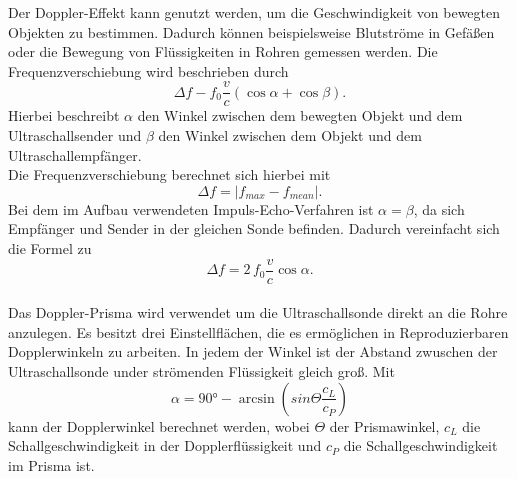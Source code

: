 Der Doppler-Effekt kann genutzt werden, um die Geschwindigkeit von bewegten Objekten zu bestimmen.
Dadurch können beispielsweise Blutströme in Gefäßen oder die Bewegung von Flüssigkeiten in Rohren gemessen werden.
Die Frequenzverschiebung wird beschrieben durch
\begin{equation*}
    Δf - f_0 \frac{v}{c} \left(\cos{α} + \cos{β}\right).
\end{equation*}%
Hierbei beschreibt $α$ den Winkel zwischen dem bewegten Objekt und dem Ultraschallsender und $β$ den Winkel zwischen dem Objekt 
und dem Ultraschallempfänger.\\
Die Frequenzverschiebung berechnet sich hierbei mit 
\begin{equation}\label{eq:fver}
    \Delta f = |f_{max} - f_{mean}|.
\end{equation}
Bei dem im Aufbau verwendeten Impuls-Echo-Verfahren ist $α = β$, da sich Empfänger und Sender in der gleichen Sonde befinden. Dadurch vereinfacht sich die Formel zu 
\begin{equation}\label{eq:Frequenzverschiebung}
    Δf = 2\, f_0 \frac{v}{c} \cos{α}.
\end{equation}
\\
Das Doppler-Prisma wird verwendet um die Ultraschallsonde direkt an die Rohre anzulegen.
Es besitzt drei Einstellflächen, die es ermöglichen in Reproduzierbaren Dopplerwinkeln zu arbeiten.
In jedem der Winkel ist der Abstand zwuschen der Ultraschallsonde under strömenden Flüssigkeit gleich groß.
Mit 
\begin{equation}\label{eq:Dopplerwinkel}
    α = 90° - \arcsin{\left(sin{Θ}\frac{c_L}{c_P}\right)}
\end{equation}
kann der Dopplerwinkel berechnet werden, wobei $Θ$ der Prismawinkel, $c_L$ die Schallgeschwindigkeit in der Dopplerflüssigkeit und $c_P$ die Schallgeschwindigkeit im Prisma ist.